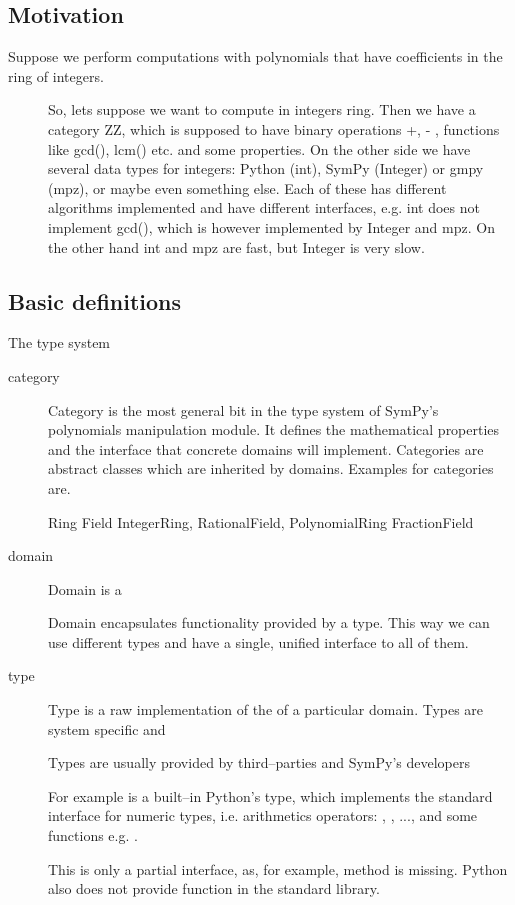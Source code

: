 \cite{Richardson1997zero}


\subsection{Motivation}
\begin{description}
\item[Suppose we perform computations with polynomials that have coefficients in the ring of integers.] \leavevmode
So, lets suppose we want to compute in integers ring. Then we have
a category ZZ, which is supposed to have binary operations +, -
, functions like gcd(), lcm() etc. and some properties. On the
other side we have several data types for integers: Python (int),
SymPy (Integer) or gmpy (mpz), or maybe even something else. Each
of these has different algorithms implemented and have different
interfaces, e.g. int does not implement gcd(), which is however
implemented by Integer and mpz. On the other hand int and mpz
are fast, but Integer is very slow.

\end{description}


\subsection{Basic definitions}

The type system
\begin{description}
\item[category] \leavevmode
Category is the most general bit in the type system of SymPy's polynomials manipulation
module. It defines the mathematical properties and the interface that concrete domains
will implement. Categories are abstract classes which are inherited by domains. Examples
for categories are.

Ring
Field
IntegerRing,
RationalField,
PolynomialRing
FractionField

\item[domain] \leavevmode
Domain is a

Domain encapsulates functionality provided by a type. This way we can use different
types and have a single, unified interface to all of them.

\item[type] \leavevmode
Type is a raw implementation of the of a particular domain. Types are system specific
and

Types are usually provided by third--parties and SymPy's developers

For example  is a built--in Python's type, which implements the standard interface
for numeric types, i.e. arithmetics operators: , , ..., and some
functions e.g. .

This is only a partial interface, as, for example,  method is missing. Python
also does not provide  function in the standard library.

\end{description}


